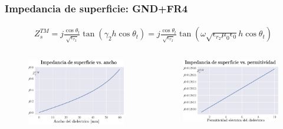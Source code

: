 \documentclass{beamer}
\begin{document}
	
		\begin{frame}
			\frametitle{Impedancia de superficie: GND+FR4}
			\begin{align*}
				Z_s^{TM} = j \frac{\cos \theta_t}{\sqrt{\epsilon_{r_2}}}\tan(\gamma_2 h \cos\theta_t) = j \frac{\cos \theta_t}{\sqrt{\epsilon_{r_2}}}\tan(	\omega\sqrt{\epsilon_{r_2} \mu_0 \epsilon_0} h \cos\theta_t)
			\end{align*}
		
			\begin{columns}[c]
				\begin{figure} [H]
					\includegraphics[width=\textwidth]{intro_electro/plot-zstm-funciont2.pdf}
				\end{figure}
				\begin{figure} [H]
					\includegraphics[width=\textwidth]{intro_electro/plot-zstm-funcioner2.pdf}
				\end{figure}
				
			\end{columns}
		\end{frame}
	
\end{document}
